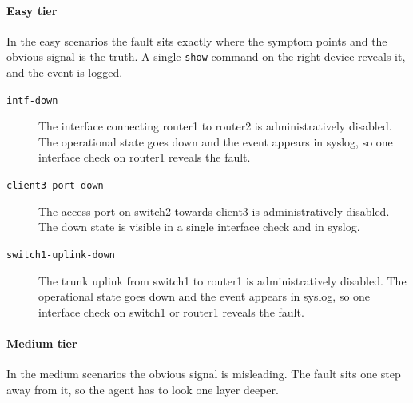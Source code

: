 \paragraph{Easy tier}
In the easy scenarios the fault sits exactly where the symptom points and the obvious signal is
the truth. A single \texttt{show} command on the right device reveals it, and the event is logged.

\begin{description}
    \item[\texttt{intf-down}] The interface connecting router1 to router2 is
          administratively disabled. The operational state goes down and the event appears in
          syslog, so one interface check on router1 reveals the fault. 
    \item[\texttt{client3-port-down}] The access port on switch2 towards
          client3 is administratively disabled.
          The down state is visible in a single interface check and in syslog. 
    \item[\texttt{switch1-uplink-down}] The trunk uplink from switch1 to router1
          is administratively disabled. The operational state goes down and the event appears in
          syslog, so one interface check on switch1 or router1 reveals the fault.
\end{description}

\paragraph{Medium tier}
In the medium scenarios the obvious signal is misleading. The fault sits one step away from
it, so the agent has to look one layer deeper.

